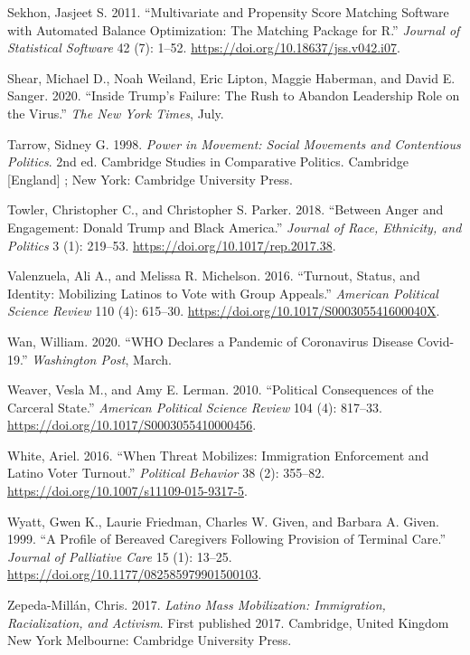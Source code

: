 \documentclass[
  12pt,
]{article}
\newlength{\cslhangindent}
\newlength{\cslentryspacingunit} %
\newenvironment{CSLReferences}[2] %
 {%
  \setlength{\parindent}{0pt}
  \ifodd #1
  \let\oldpar\par
  \def\par{\hangindent=\cslhangindent\oldpar}
  \fi
  \setlength{\parskip}{#2\cslentryspacingunit}
 }%
 {}
\begin{document}
\begin{CSLReferences}{1}{0}
\leavevmode{}%
Sekhon, Jasjeet S. 2011. {``Multivariate and {Propensity Score Matching Software} with {Automated Balance Optimization}: {The Matching} Package for {R}.''} \emph{Journal of Statistical Software} 42 (7): 1--52. \url{https://doi.org/10.18637/jss.v042.i07}.

\leavevmode{}%
Shear, Michael D., Noah Weiland, Eric Lipton, Maggie Haberman, and David E. Sanger. 2020. {``Inside {Trump}'s {Failure}: {The Rush} to {Abandon Leadership Role} on the {Virus}.''} \emph{The New York Times}, July.

\leavevmode{}%
Tarrow, Sidney G. 1998. \emph{Power in Movement: Social Movements and Contentious Politics}. 2nd ed. Cambridge Studies in Comparative Politics. {Cambridge {[}England{]} ; New York}: {Cambridge University Press}.

\leavevmode{}%
Towler, Christopher C., and Christopher S. Parker. 2018. {``Between {Anger} and {Engagement}: {Donald Trump} and {Black America}.''} \emph{Journal of Race, Ethnicity, and Politics} 3 (1): 219--53. \url{https://doi.org/10.1017/rep.2017.38}.

\leavevmode{}%
Valenzuela, Ali A., and Melissa R. Michelson. 2016. {``Turnout, {Status}, and {Identity}: {Mobilizing Latinos} to {Vote} with {Group Appeals}.''} \emph{American Political Science Review} 110 (4): 615--30. \url{https://doi.org/10.1017/S000305541600040X}.

\leavevmode{}%
Wan, William. 2020. {``{WHO} Declares a Pandemic of Coronavirus Disease Covid-19.''} \emph{Washington Post}, March.

\leavevmode{}%
Weaver, Vesla M., and Amy E. Lerman. 2010. {``Political {Consequences} of the {Carceral State}.''} \emph{American Political Science Review} 104 (4): 817--33. \url{https://doi.org/10.1017/S0003055410000456}.

\leavevmode{}%
White, Ariel. 2016. {``When {Threat Mobilizes}: {Immigration Enforcement} and {Latino Voter Turnout}.''} \emph{Political Behavior} 38 (2): 355--82. \url{https://doi.org/10.1007/s11109-015-9317-5}.

\leavevmode{}%
Wyatt, Gwen K., Laurie Friedman, Charles W. Given, and Barbara A. Given. 1999. {``A {Profile} of {Bereaved Caregivers} Following {Provision} of {Terminal Care}.''} \emph{Journal of Palliative Care} 15 (1): 13--25. \url{https://doi.org/10.1177/082585979901500103}.

\leavevmode{}%
Zepeda-Millán, Chris. 2017. \emph{Latino Mass Mobilization: Immigration, Racialization, and Activism}. First published 2017. {Cambridge, United Kingdom New York Melbourne}: {Cambridge University Press}.

\end{CSLReferences}
\end{document}
